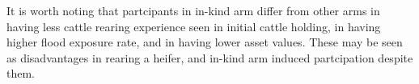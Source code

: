 	It is worth noting that partcipants in in-kind arm differ from other arms in having less cattle rearing experience seen in initial cattle holding, in having higher flood exposure rate, and in having lower asset values. These may be seen as disadvantages in rearing a heifer, and in-kind arm induced partcipation despite them.
	
%



